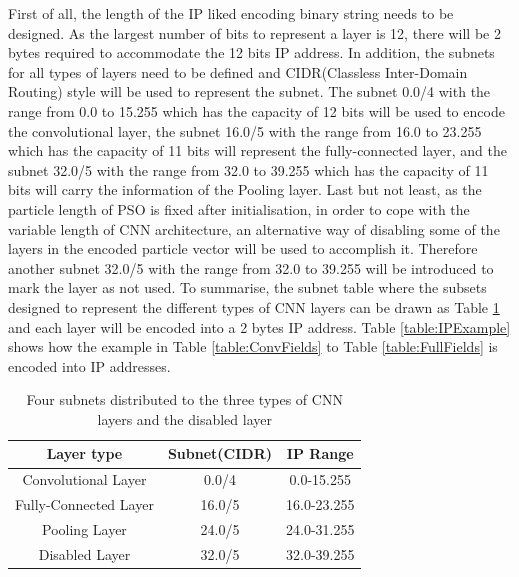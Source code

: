 \documentclass[conference]{IEEEtran}
\begin{document}
First of all, the length of the IP liked encoding binary string needs to be designed. As the largest number of bits to represent a layer is 12, there will be 2 bytes required to accommodate the 12 bits IP address. 
In addition, the subnets for all types of layers need to be defined and CIDR(Classless Inter-Domain Routing) style will be used to represent the subnet. The subnet 0.0/4 with the range from 0.0 to 15.255 which has the capacity of 12 bits will be used to encode the convolutional layer, the subnet 16.0/5 with the range from 16.0 to 23.255 which has the capacity of 11 bits will represent the fully-connected layer, and the subnet 32.0/5 with the range from 32.0 to 39.255 which has the capacity of 11 bits will carry the information of the Pooling layer. 
Last but not least, as the particle length of PSO is fixed after initialisation,  in order to cope with the variable length of CNN architecture, an alternative way of disabling some of the layers in the encoded particle vector will be used to accomplish it. Therefore another subnet 32.0/5 with the range from 32.0 to 39.255 will be introduced to mark the layer as not used. 
To summarise, the subnet table where the subsets designed to represent the different types of CNN layers can be drawn as Table \ref{table:Subnets} and each layer will be encoded into a 2 bytes IP address. Table \ref{table:IPExample} shows how the example in Table \ref{table:ConvFields} to Table \ref{table:FullFields} is encoded into IP addresses. 

\begin{table}[!t]
	\renewcommand{\arraystretch}{1.3}
	\caption{Four subnets distributed to the three types of CNN layers and the disabled layer}
	\label{table:Subnets}
	\centering
	\begin{tabular}{|c|c|c|}
		\hline
		Layer type & Subnet(CIDR) & IP Range\\
		\hline
		Convolutional Layer & 0.0/4 & 0.0-15.255\\
		\hline
		Fully-Connected Layer & 16.0/5 & 16.0-23.255\\
		\hline
		Pooling Layer & 24.0/5 & 24.0-31.255\\
		\hline
		Disabled Layer & 32.0/5 & 32.0-39.255\\
		\hline
	\end{tabular}
\end{table}
\end{document}
